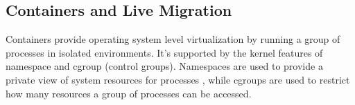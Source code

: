 



\subsection{Containers and Live Migration}

Containers provide operating system level virtualization by running a group of processes in isolated environments. It's supported by the kernel features of namespace 
 and cgroup (control groups)\cite{rosen2014container}.
Namespaces are used to provide a private view of system resources for processes \cite{pike1992plan9}, while cgroups are used to restrict how many resources a group of processes can be accessed\cite{rosen2013namespaceIntro}.  

